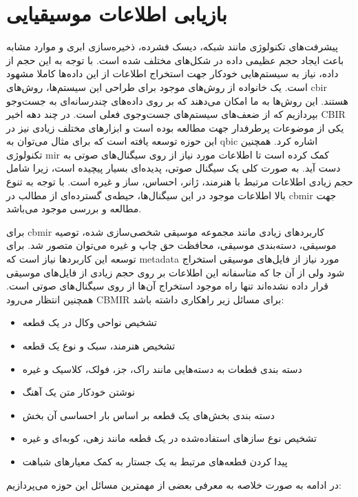 \section{بازیابی اطلاعات موسیقیایی}
پیشرفت‌های تکنولوژی مانند شبکه، دیسک فشرده، ذخیره‌سازی ابری و موارد مشابه باعث
ایجاد حجم عظیمی داده در شکل‌های مختلف شده است. با توجه به این حجم از داده، نیاز
به سیستم‌هایی خودکار جهت استخراج اطلاعات از این داده‌ها کاملا مشهود است. یک
خانواده از روش‌های موجود برای طراحی این سیستم‌ها، روش‌های \gls{cbir} هستند. این
روش‌ها به ما امکان می‌دهند که بر روی داده‌های چندرسانه‌ای به جست‌وجو بپردازیم که
از ضعف‌های سیستم‌های جست‌وجوی فعلی است. در چند دهه اخیر \gls{CBIR} یکی از
موضوعات پرطرفدار جهت مطالعه بوده است و ابزارهای مختلف زیادی نیز در این حوزه
توسعه یافته است که برای مثال می‌توان به \gls{qbic} اشاره کرد. همچنین تکنولوژی
\gls{mir} کمک کرده است تا اطلاعات مورد نیاز از روی سیگنال‌های صوتی به دست آید.
به صورت کلی یک سیگنال صوتی، پدیده‌ای بسیار پیچیده است، زیرا شامل حجم زیادی
اطلاعات مرتبط با هنرمند، ژانر، احساس، ساز و غیره است. با توجه به تنوع بالا
اطلاعات موجود در این سیگنال‌ها، حیطه‌ی گسترده‌ای از مطالب در \gls{cbmir} جهت
مطالعه و بررسی موجود می‌باشد.

برای \gls{cbmir} کاربردهای زیادی مانند مجموعه موسیقی شخصی‌سازی شده، توصیه
موسیقی، دسته‌بندی موسیقی، محافظت حق چاپ و غیره می‌توان متصور شد. برای توسعه این
کاربردها نیاز است که \gls{metadata} مورد نیاز از فایل‌های موسیقی استخراج شود ولی
از آن جا که متاسفانه این اطلاعات بر روی حجم زیادی از فایل‌های موسیقی قرار داده
نشده‌اند تنها راه موجود استخراج آن‌ها از روی سیگنال‌های صوتی است. همچنین انتظار
می‌رود \gls{CBMIR} برای مسائل زیر راهکاری داشته باشد:
\begin{itemize}
    \item تشخیص نواحی وکال در یک قطعه
    \item تشخیص هنرمند، سبک و نوع یک قطعه
    \item دسته بندی قطعات به دسته‌هایی مانند راک، جز، فولک، کلاسیک و غیره
    \item نوشتن خودکار متن یک آهنگ
    \item دسته بندی بخش‌های یک قطعه بر اساس بار احساسی آن بخش
    \item تشخیص نوع سازهای استفاده‌شده در یک قطعه مانند زهی، کوبه‌ای و غیره
    \item پیدا کردن قطعه‌های مرتبط به یک جستار به کمک معیارهای شباهت	
\end{itemize}

در ادامه به صورت خلاصه به معرفی بعضی از مهمترین مسائل این حوزه می‌پردازیم:

